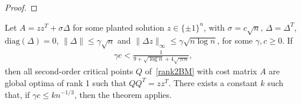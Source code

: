 \documentclass{colt2016} %
\newcommand{\transpose}{^\top\! }
\newcommand{\diag}{\mathrm{diag}}
\newcommand{\rank}{\operatorname{rank}}
\newcommand{\nulll}{\operatorname{null}}
\newcommand{\1}{\mathbf{1}}
\newcommand{\TODO}[1]{{\color{red}{[#1]}}}
\newcommand{\ddiag}{\mathrm{ddiag}}
\begin{document}
\begin{proof}
\end{proof}


\begin{theorem} \label{thm:maxcutrktwo}
	Let $A = zz^T + \sigma \Delta $ for some planted solution $z \in \{\pm 1\}^n$, with $\sigma = c\sqrt{n}$, $\Delta  = \Delta^T$, $\diag(\Delta ) = 0$, $\|\Delta \| \leq \gamma \sqrt{n}$ and $\|\Delta z\|_\infty \leq \gamma \sqrt{n \log n}$, for some $\gamma, c \geq 0$. If
	\begin{align*}
		\gamma c < \frac{1}{9 + \sqrt{\log n} + 4\sqrt{\gamma c n}},
	\end{align*}
	then all second-order critical points $Q$ of~\eqref{rank2BM} with cost matrix $A$ are global optima of rank 1 such that $QQ^T = zz^T$.
%	
%	
	There exists a constant $k$ such that, if $\gamma c \leq k n^{-1/3}$, then the theorem applies.
\end{theorem}
\end{document}

